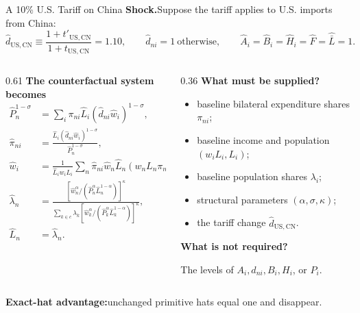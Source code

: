\documentclass[aspectratio=169,11pt]{beamer}
\newcommand{\B}[1]{\textcolor{blue1}{\textbf{#1}}}
\newcommand{\wh}[1]{\widehat{#1}}
\begin{document}
\begin{frame}[t]{A 10\% U.S. Tariff on China}
  \footnotesize
  \B{Shock.}\quad Suppose the tariff applies to U.S. imports from China:
  \[
    \wh d_{\mathrm{US,CN}}
      \equiv\frac{1+t'_{\mathrm{US,CN}}}{1+t_{\mathrm{US,CN}}}=1.10,
    \qquad \wh d_{ni}=1\ \text{otherwise},
    \qquad
    \wh A_i=\wh B_i=\wh H_i=\wh F=\wh{\bar L}=1.
  \]

  \vspace{-0.4em}
  \begin{columns}[T,onlytextwidth]
    \begin{column}{0.61\textwidth}
      \B{The counterfactual system becomes}
      \begin{align*}
        \wh P_n^{1-\sigma}
          &=\sum_i\pi_{ni}\wh L_i
            (\wh d_{ni}\wh w_i)^{1-\sigma},\\
        \wh\pi_{ni}
          &=\frac{\wh L_i(\wh d_{ni}\wh w_i)^{1-\sigma}}
            {\wh P_n^{1-\sigma}},\\
        \wh w_i
          &=\frac{1}{\wh L_iw_iL_i}
            \sum_n\wh\pi_{ni}\wh w_n\wh L_n
            (w_nL_n\pi_{ni}),\\
        \wh\lambda_n
          &=\frac{\left[
            \wh w_n^\alpha/
            (\wh P_n^\alpha\wh L_n^{1-\alpha})
            \right]^\kappa}
            {\sum_{k\in c}\lambda_k\left[
            \wh w_k^\alpha/
            (\wh P_k^\alpha\wh L_k^{1-\alpha})
            \right]^\kappa},\\
        \wh L_n&=\wh\lambda_n.
      \end{align*}
    \end{column}
    \begin{column}{0.36\textwidth}
      \B{What must be supplied?}
      \begin{itemize}\setlength{\itemsep}{3pt}
        \item baseline bilateral expenditure shares \(\pi_{ni}\);
        \item baseline income and population \((w_iL_i,L_i)\);
        \item baseline population shares \(\lambda_i\);
        \item structural parameters \((\alpha,\sigma,\kappa)\);
        \item the tariff change \(\wh d_{\mathrm{US,CN}}\).
      \end{itemize}

      \medskip
      \B{What is not required?}\par
      The levels of \(A_i,d_{ni},B_i,H_i\), or \(P_i\).
    \end{column}
  \end{columns}

  \vfill
  \B{Exact-hat advantage:}\quad unchanged primitive hats equal one and disappear.
\end{frame}
\end{document}
